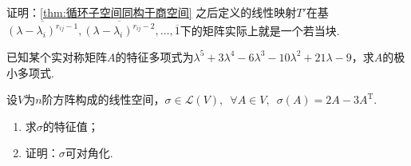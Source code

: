 \begin{exercise}

    \begin{exgroup}
        \item
    \end{exgroup}

    \begin{exgroup}
        \item 证明：\autoref{thm:循环子空间同构于商空间} 之后定义的线性映射$T'$在基$\overline{(\lambda-\lambda_i)^{r_{ij}-1}},\overline{(\lambda-\lambda_i)^{r_{ij}-2}},\ldots,\overline{1}$下的矩阵实际上就是一个若当块.
        \item 已知某个实对称矩阵$A$的特征多项式为$\lambda^5+3\lambda^4-6\lambda^3-10\lambda^2+21\lambda-9$，求$A$的极小多项式.
        \item 设$V$为$n$阶方阵构成的线性空间，$\sigma\in \mathcal{L}(V),\enspace \forall A\in V,\enspace \sigma(A)=2A-3A^{\mathrm{T}}$.
        \begin{enumerate}
            \item 求$\sigma$的特征值；
            \item 证明：$\sigma$可对角化.
        \end{enumerate}
    \end{exgroup}

    \begin{exgroup}
        \item
    \end{exgroup}
\end{exercise}
